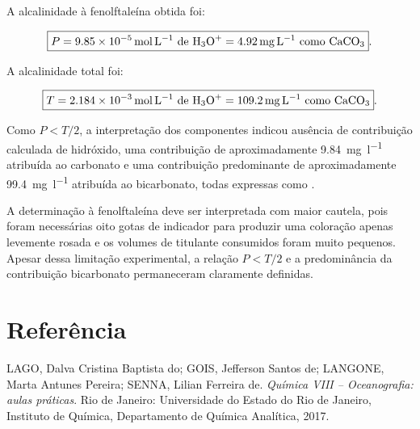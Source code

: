\documentclass[a4paper,12pt]{article}
\begin{document}
A alcalinidade à fenolftaleína obtida foi:

\begin{equation*}
\boxed{
P=
\qty{9.85e-5}{\mole\per\litre}\ \text{de \ce{H3O+}}
=
\qty{4.92}{\milli\gram\per\litre}\ \text{como \ce{CaCO3}}
}.
\end{equation*}

A alcalinidade total foi:

\begin{equation*}
\boxed{
T=
\qty{2.184e-3}{\mole\per\litre}\ \text{de \ce{H3O+}}
=
\qty{109.2}{\milli\gram\per\litre}\ \text{como \ce{CaCO3}}
}.
\end{equation*}

Como $P<T/2$, a interpretação dos componentes indicou ausência de
contribuição calculada de hidróxido, uma contribuição de aproximadamente
\qty{9.84}{\milli\gram\per\litre} atribuída ao carbonato e uma contribuição
predominante de aproximadamente
\qty{99.4}{\milli\gram\per\litre} atribuída ao bicarbonato, todas expressas
como .

A determinação à fenolftaleína deve ser interpretada com maior cautela,
pois foram necessárias oito gotas de indicador para produzir uma coloração
apenas levemente rosada e os volumes de titulante consumidos foram muito
pequenos. Apesar dessa limitação experimental, a relação $P<T/2$ e a
predominância da contribuição bicarbonato permaneceram claramente
definidas.

\section*{Referência}

LAGO, Dalva Cristina Baptista do; GOIS, Jefferson Santos de; LANGONE,
Marta Antunes Pereira; SENNA, Lilian Ferreira de.
\textit{Química VIII -- Oceanografia: aulas práticas}.
Rio de Janeiro: Universidade do Estado do Rio de Janeiro,
Instituto de Química, Departamento de Química Analítica, 2017.
\end{document}
